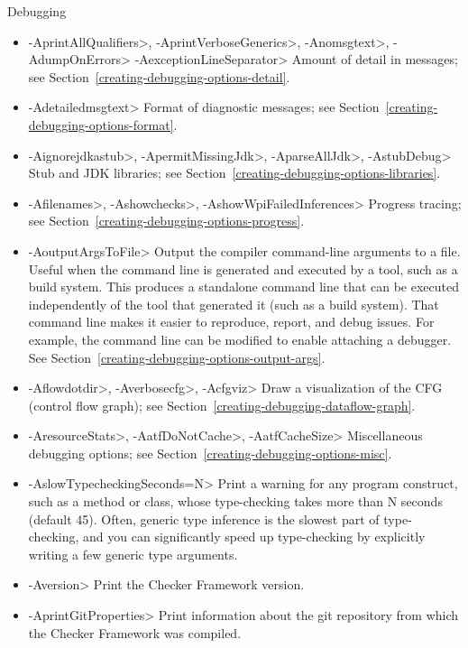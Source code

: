 Debugging
\begin{itemize}
\item
 \<-AprintAllQualifiers>,
 \<-AprintVerboseGenerics>,
 \<-Anomsgtext>,
 \<-AdumpOnErrors>
 \<-AexceptionLineSeparator>
Amount of detail in messages; see Section~\ref{creating-debugging-options-detail}.

\item
 \<-Adetailedmsgtext>
Format of diagnostic messages; see Section~\ref{creating-debugging-options-format}.

\item
 \<-Aignorejdkastub>,
 \<-ApermitMissingJdk>,
 \<-AparseAllJdk>,
 \<-AstubDebug>
Stub and JDK libraries; see Section~\ref{creating-debugging-options-libraries}.

\item
 \<-Afilenames>,
 \<-Ashowchecks>,
 \<-AshowWpiFailedInferences>
Progress tracing; see Section~\ref{creating-debugging-options-progress}.

\item
\<-AoutputArgsToFile>
Output the compiler command-line arguments to a file.  Useful when the
command line is generated and executed by a tool, such as a build system.
This produces a standalone command line that can be executed independently
of the tool that generated it (such as a build system).
That command line makes it easier to reproduce, report, and debug issues.
For example, the command line can be modified to enable attaching a debugger.
See Section~\ref{creating-debugging-options-output-args}.

\item
 \<-Aflowdotdir>,
 \<-Averbosecfg>,
 \<-Acfgviz>
 Draw a visualization of the CFG (control flow graph); see
 Section~\ref{creating-debugging-dataflow-graph}.

\item
 \<-AresourceStats>,
 \<-AatfDoNotCache>,
 \<-AatfCacheSize>
Miscellaneous debugging options; see Section~\ref{creating-debugging-options-misc}.

\item
 \<-AslowTypecheckingSeconds=N>
Print a warning for any program construct, such as a method or class, whose
type-checking takes more than N seconds (default 45).
Often, generic type inference is the slowest part of type-checking, and you
can significantly speed up type-checking by explicitly writing a few
generic type arguments.

\item
 \<-Aversion>
Print the Checker Framework version.

\item
 \<-AprintGitProperties>
Print information about the git repository from which the Checker Framework
was compiled.

\end{itemize}


